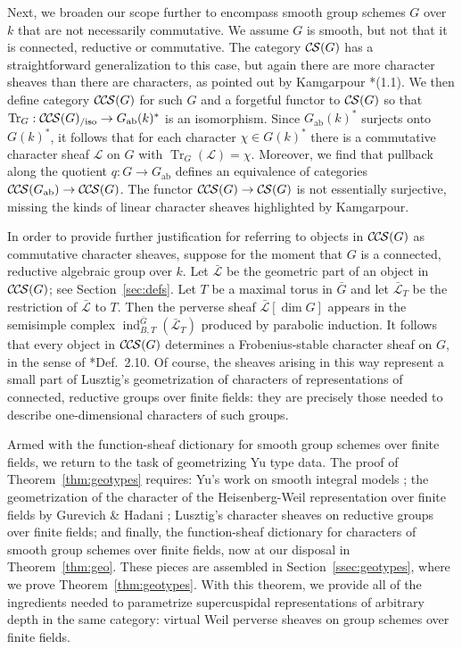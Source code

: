 \documentclass[10pt]{amsart}
\theoremstyle{plain}
\theoremstyle{definition}
\newcommand{\Fq}{k}
\newcommand{\ab}{_{\operatorname{ab}}}
\DeclareMathOperator{\Tr}{Tr}
\newcommand{\TrFrob}[1]{\Tr_{#1}}
\newcommand{\cs}[1]{{\mathcal{#1}}}
\newcommand{\gcs}[1]{{\mathcal{\bar #1}}}
\newcommand{\CS}{{\mathcal{C\hskip-0.8pt S}}}
\newcommand{\CCS}{{\mathcal{C\hskip-.8pt C\hskip-0.8pt S}}}
\newcommand{\CCSiso}[1]{\CCS(#1)_{/\text{iso}}}
\newcommand{\bG}{\bar{G}}
\begin{document}
Next, we broaden our scope further to encompass smooth group schemes $G$ over $\Fq$ that are not necessarily commutative.
We assume $G$ is smooth, but not that it is connected, reductive or commutative. 
The category $\CS(G)$ has a straightforward generalization to this case, but again
there are more character sheaves than there are characters, as pointed out by Kamgarpour \cite{kamgarpour:09a}*{(1.1)}.
We then define category $\CCS(G)$ for such $G$ and a forgetful functor to $\CS(G)$ so that $\TrFrob{G} : \CCSiso{G} \to G\ab(k)^*$
is an isomorphism.  
Since $G\ab(k)^*$ surjects onto $G(k)^*$, it follows that for each character $\chi \in G(k)^*$ there is a commutative
character sheaf $\cs{L}$ on $G$ with $\TrFrob{G}(\cs{L}) = \chi$. Moreover, we find that pullback along the quotient $q : G \to G\ab$
defines an equivalence of categories $\CCS(G\ab) \to \CCS(G)$.  
The functor $\CCS(G) \to \CS(G)$ is not
essentially surjective, missing the kinds of linear character sheaves highlighted by Kamgarpour.
%

In order to provide further justification for referring to objects in $\CCS(G)$ as commutative character sheaves, suppose for the moment that $G$ is a connected, reductive algebraic group over $\Fq$.
Let $\gcs{L}$ be the geometric part of an object in $\CCS(G)$; see Section~\ref{sec:defs}.
Let $T$ be a maximal torus in $\bG$ and let $\gcs{L}_T$ be the restriction of $\gcs{L}$ to $T$.
Then the perverse sheaf $\gcs{L}[\dim G]$ appears in the semisimple complex $\operatorname{ind}_{B,T}^{\bG}(\gcs{L}_T)$ produced by parabolic induction.
It follows that every object in $\CCS(G)$ determines a Frobenius-stable character sheaf on $G$, in the sense of \cite{lusztig:85a}*{Def.~2.10}.
Of course, the sheaves arising in this way represent a small part of Lusztig's geometrization of characters of representations of connected, reductive groups over finite fields:
they are precisely those needed to describe one-dimensional characters of such groups.

Armed with the function-sheaf dictionary for smooth group schemes over finite fields, we return to the task of geometrizing Yu type data. 
The proof of Theorem~\ref{thm:geotypes} requires: Yu's work on smooth integral models \cite{Yu:models}; the geometrization of the character of the Heisenberg-Weil representation over finite fields by Gurevich \& Hadani \cite{gurevich-hadani:07a}; Lusztig's character sheaves on reductive groups over finite fields; and finally, the function-sheaf dictionary for characters of smooth group schemes over finite fields, now at our disposal in Theorem~\ref{thm:geo}.
These pieces are assembled in Section~\ref{ssec:geotypes}, where we prove Theorem~\ref{thm:geotypes}.
With this theorem, we provide all of the ingredients needed to parametrize supercuspidal representations of arbitrary depth in the same category:
virtual Weil perverse sheaves on group schemes over finite fields. 
 
\end{document}
